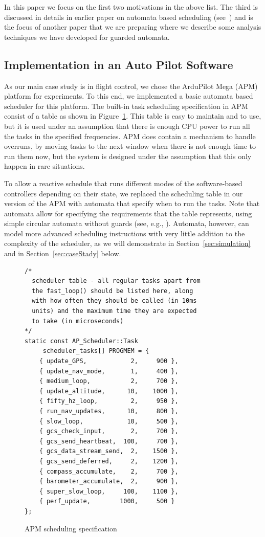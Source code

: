 \documentclass{sig-alternate-ipsn13}
\begin{document}
In this paper we focus on the first two motivations in the above list. The third is discussed in details in earlier paper on automata based scheduling (see~\cite{weiss2007automata,RTComposer,AW08}) and is the focus of another paper that we are preparing where we describe some analysis techniques we have developed for guarded automata.   

\subsection{Implementation in an Auto Pilot Software}
As our main case study is in flight control, we chose the ArduPilot Mega
(APM) platform for experiments. To this end, we implemented a basic automata based scheduler for this platform. The built-in task scheduling specification in APM consist of a table as shown in Figure~\ref{fig:apm-scheduler}. This table is easy to maintain and to use, but it is used under an assumption that there is enough CPU power to run all the tasks in the specified frequencies. APM does contain a mechanism to handle overruns, by moving tasks to the next window when there is not enough time to run them now, but the system is designed under the assumption that this only happen in rare situations.

To allow a reactive schedule that runs different modes of the software-based controllers depending on their state, we replaced the scheduling table in our version of the APM with automata that specify when to run the tasks. Note that automata allow for specifying the requirements that the table represents, using simple circular automata without guards (see, e.g., \cite{weiss2007automata}). Automata, however, can model more advanced scheduling instructions with very little addition to the complexity of the scheduler, as we will demonstrate in Section~\ref{sec:simulation} and in Section~\ref{sec:caseStady} below.

\begin{figure}
	\scriptsize
	\begin{lstlisting}
/*
  scheduler table - all regular tasks apart from
  the fast_loop() should be listed here, along 
  with how often they should be called (in 10ms 
  units) and the maximum time they are expected 
  to take (in microseconds)
*/
static const AP_Scheduler::Task 
     scheduler_tasks[] PROGMEM = {
	{ update_GPS,            2,     900 },
	{ update_nav_mode,       1,     400 },
	{ medium_loop,           2,     700 },
	{ update_altitude,      10,    1000 },
	{ fifty_hz_loop,         2,     950 },
	{ run_nav_updates,      10,     800 },
	{ slow_loop,            10,     500 },
	{ gcs_check_input,       2,     700 },
	{ gcs_send_heartbeat,  100,     700 },
	{ gcs_data_stream_send,  2,    1500 },
	{ gcs_send_deferred,     2,    1200 },
	{ compass_accumulate,    2,     700 },
	{ barometer_accumulate,  2,     900 },
	{ super_slow_loop,     100,    1100 },
	{ perf_update,        1000,     500 }
};
	\end{lstlisting}
	\caption{APM scheduling specification}
	\label{fig:apm-scheduler} 
\end{figure}
\end{document}
